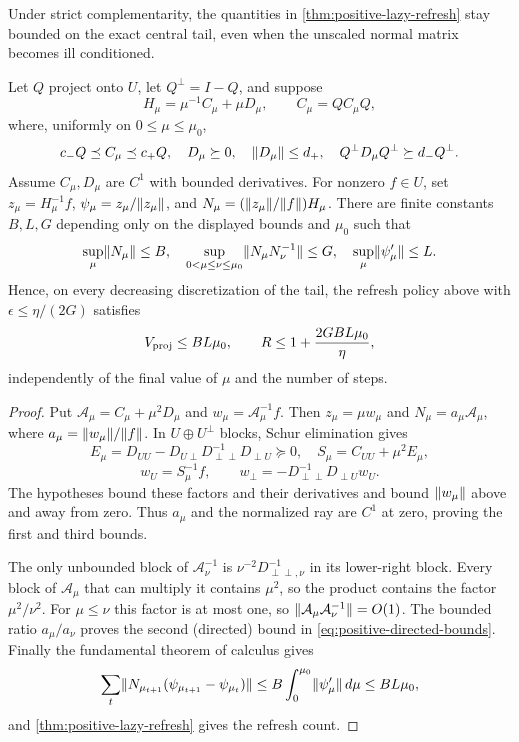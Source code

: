 Under strict complementarity, the quantities in
\cref{thm:positive-lazy-refresh} stay bounded on the exact central tail, even
when the unscaled normal matrix becomes ill conditioned.

\begin{theorem}
\label{thm:positive-directed-tail}
Let $Q$ project onto $U$, let $Q^\perp=I-Q$, and suppose
\begin{equation}
 H_\mu=\mu^{-1}C_\mu+\mu D_\mu,\qquad
 C_\mu=QC_\mu Q,                                       \label{eq:positive-tail-split}
\end{equation}
where, uniformly on $0\leq\mu\leq\mu_0$,
\[
 c_-Q\preceq C_\mu\preceq c_+Q,\quad D_\mu\succeq0,\quad
 \lVert D_\mu\rVert\leq d_+,\quad Q^\perp D_\mu Q^\perp\succeq d_-Q^\perp.
\]
Assume $C_\mu,D_\mu$ are $C^1$ with bounded derivatives.  For nonzero
$f\in U$, set $z_\mu=H_\mu^{-1}f$, $\psi_\mu=z_\mu/\lVert z_\mu\rVert$, and
$N_\mu=(\lVert z_\mu\rVert/\lVert f\rVert)H_\mu$.  There are finite constants $B,L,G$
depending only on the displayed bounds and $\mu_0$ such that
\begin{equation}
 \sup_\mu\lVert N_\mu\rVert\leq B,\quad
 \sup_{0<\mu\leq\nu\leq\mu_0}\lVert N_\mu N_\nu^{-1}\rVert\leq G,\quad
 \sup_\mu\lVert\psi_\mu'\rVert\leq L.                       \label{eq:positive-directed-bounds}
\end{equation}
Hence, on every decreasing discretization of the tail, the refresh policy
above with $\epsilon\leq\eta/(2G)$ satisfies
\begin{equation}
 V_{\rm proj}\leq BL\mu_0,\qquad
 R\leq1+\frac{2GBL\mu_0}{\eta},                        \label{eq:positive-tail-refresh}
\end{equation}
independently of the final value of $\mu$ and the number of steps.
\end{theorem}

\begin{proof}
Put $\mathcal A_\mu=C_\mu+\mu^2D_\mu$ and
$w_\mu=\mathcal A_\mu^{-1}f$.
Then $z_\mu=\mu w_\mu$ and
$N_\mu=a_\mu\mathcal A_\mu$, where $a_\mu=\lVert w_\mu\rVert/\lVert f\rVert$.
In $U\oplus U^\perp$ blocks, Schur elimination gives
\[
 E_\mu=D_{UU}-D_{U\perp}D_{\perp\perp}^{-1}D_{\perp U}\succeq0,\quad
 S_\mu=C_{UU}+\mu^2E_\mu,
\]
\[
 w_U=S_\mu^{-1}f,\qquad
 w_\perp=-D_{\perp\perp}^{-1}D_{\perp U}w_U.
\]
The hypotheses bound these factors and their derivatives and bound
$\lVert w_\mu\rVert$ above and away from zero.  Thus $a_\mu$ and the normalized ray
are $C^1$ at zero, proving the first and third bounds.

The only unbounded block of $\mathcal A_\nu^{-1}$ is
$\nu^{-2}D_{\perp\perp,\nu}^{-1}$ in its lower-right block.  Every block of $\mathcal A_\mu$
that can multiply it contains $\mu^2$, so the product contains the factor
$\mu^2/\nu^2$.  For $\mu\leq\nu$ this factor is at most one, so $\lVert\mathcal A_\mu\mathcal A_\nu^{-1}\rVert=O(1)$.  The bounded ratio
$a_\mu/a_\nu$ proves the second (directed) bound in
\eqref{eq:positive-directed-bounds}.  Finally the fundamental
theorem of calculus gives
\[
 \sum_t\lVert N_{\mu_{t+1}}(\psi_{\mu_{t+1}}-\psi_{\mu_t})\rVert
 \leq B\int_0^{\mu_0}\lVert\psi_\mu'\rVert\,d\mu\leq BL\mu_0,
\]
and \cref{thm:positive-lazy-refresh} gives the refresh count.
\end{proof}

